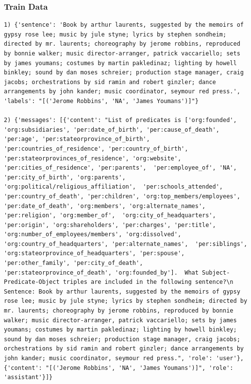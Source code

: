 \documentclass{article}
\begin{document}
\subsubsection{Train Data}
\begin{lstlisting}
1) {'sentence': 'Book by arthur laurents, suggested by the memoirs of gypsy rose lee; music by jule styne; lyrics by stephen sondheim; directed by mr. laurents; choreography by jerome robbins, reproduced by bonnie walker; music director-arranger, patrick vaccariello; sets by james youmans; costumes by martin pakledinaz; lighting by howell binkley; sound by dan moses schreier; production stage manager, craig jacobs; orchestrations by sid ramin and robert ginzler; dance arrangements by john kander; music coordinator, seymour red press.', 'labels': "[('Jerome Robbins', 'NA', 'James Youmans')]"}

2) {'messages': [{'content': "List of predicates is ['org:founded', 'org:subsidiaries', 'per:date_of_birth', 'per:cause_of_death',  'per:age', 'per:stateorprovince_of_birth', 'per:countries_of_residence', 'per:country_of_birth',  'per:stateorprovinces_of_residence', 'org:website', 'per:cities_of_residence', 'per:parents',  'per:employee_of', 'NA', 'per:city_of_birth', 'org:parents', 'org:political/religious_affiliation',  'per:schools_attended', 'per:country_of_death', 'per:children', 'org:top_members/employees',  'per:date_of_death', 'org:members', 'org:alternate_names', 'per:religion', 'org:member_of',  'org:city_of_headquarters', 'per:origin', 'org:shareholders', 'per:charges', 'per:title',  'org:number_of_employees/members', 'org:dissolved', 'org:country_of_headquarters', 'per:alternate_names',  'per:siblings', 'org:stateorprovince_of_headquarters', 'per:spouse', 'per:other_family', 'per:city_of_death',  'per:stateorprovince_of_death', 'org:founded_by'].  What Subject-Predicate-Object triples are included in the following sentence?\n Sentence: Book by arthur laurents, suggested by the memoirs of gypsy rose lee; music by jule styne; lyrics by stephen sondheim; directed by mr. laurents; choreography by jerome robbins, reproduced by bonnie walker; music director-arranger, patrick vaccariello; sets by james youmans; costumes by martin pakledinaz; lighting by howell binkley; sound by dan moses schreier; production stage manager, craig jacobs; orchestrations by sid ramin and robert ginzler; dance arrangements by john kander; music coordinator, seymour red press.", 'role': 'user'}, {'content': "[('Jerome Robbins', 'NA', 'James Youmans')]", 'role': 'assistant'}]}


\end{lstlisting}
\end{document}
